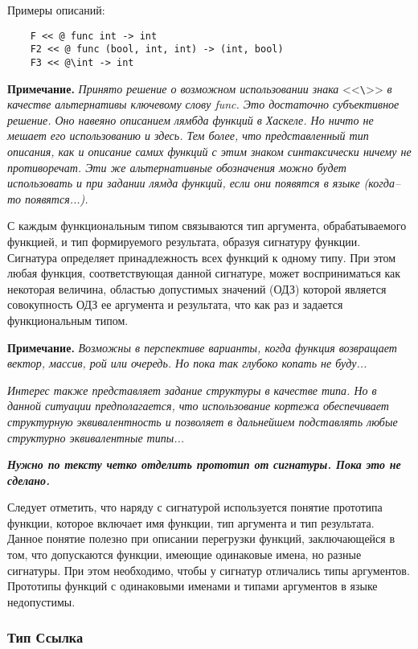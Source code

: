 {Примеры описаний:

\begin{verbatim}
    F << @ func int -> int
    F2 << @ func (bool, int, int) -> (int, bool)
    F3 << @\int -> int
\end{verbatim}

\textbf{Примечание.}
\textit{Принято решение о возможном использовании знака} <<\verb|\|>> \textit{в качестве альтернативы ключевому слову func. Это достаточно субъективное решение. Оно навеяно описанием лямбда функций в Хаскеле. Но ничто не мешает его использованию и здесь. Тем более, что представленный тип описания, как и описание самих функций с этим знаком синтаксически ничему не противоречат. Эти же альтернативные обозначения можно будет использовать и при задании лямда функций, если они появятся в языке (когда--то появятся...).}

С каждым функциональным типом связываются тип аргумента, обрабатываемого функцией, и тип формируемого результата, образуя сигнатуру функции. Сигнатура определяет принадлежность всех функций к одному типу. При этом любая функция, соответствующая данной сигнатуре, может восприниматься как некоторая величина, областью допустимых значений (ОДЗ) которой является совокупность ОДЗ ее аргумента и результата, что как раз и задается функциональным типом.

\textbf{Примечание.}
\textit{Возможны в перспективе варианты, когда функция возвращает вектор, массив, рой или очередь. Но пока так глубоко копать не буду...}

\textit{Интерес также представляет задание структуры в качестве типа. Но в данной ситуации предполагается, что использование кортежа обеспечивает структурную эквивалентность и позволяет в дальнейшем подставлять любые структурно эквивалентные типы...}

\textbf{\textit{Нужно по тексту четко отделить прототип от сигнатуры. Пока это не сделано.}}

Следует отметить, что наряду с сигнатурой используется понятие прототипа функции, которое включает имя функции, тип аргумента и тип результата. Данное понятие полезно при описании перегрузки функций, заключающейся в том, что допускаются функции, имеющие одинаковые имена, но разные сигнатуры. При этом необходимо, чтобы у сигнатур отличались типы аргументов. Прототипы функций с одинаковыми именами и типами аргументов в языке недопустимы.

\subsubsection{Тип Ссылка}

}
